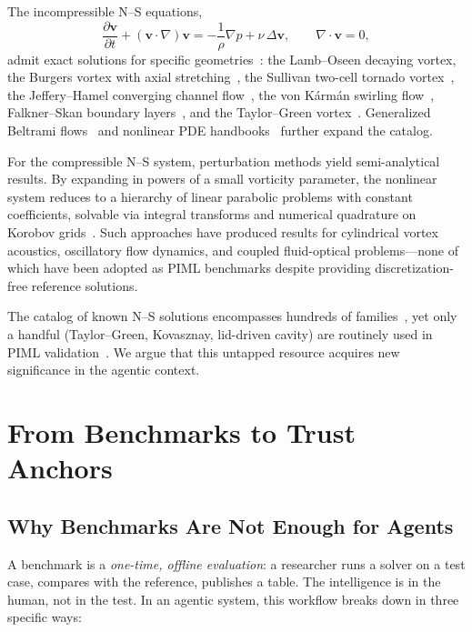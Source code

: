 \documentclass[conference]{IEEEtran}
\begin{document}
The incompressible N--S equations,
\begin{equation}\label{eq:NS}
  \frac{\partial \mathbf{v}}{\partial t} + (\mathbf{v}\cdot\nabla)\mathbf{v}
    = -\frac{1}{\rho}\nabla p + \nu\,\Delta\mathbf{v},
  \qquad \nabla\cdot\mathbf{v}=0,
\end{equation}
admit exact solutions for specific geometries~\cite{Drazin2006,Wang1991}: the Lamb--Oseen decaying vortex, the Burgers vortex with axial stretching~\cite{Burgers1948}, the Sullivan two-cell tornado vortex~\cite{Sullivan1959}, the Jeffery--Hamel converging channel flow~\cite{Jeffery1915}, the von K\'arm\'an swirling flow~\cite{Karman1921}, Falkner--Skan boundary layers~\cite{Schlichting2017}, and the Taylor--Green vortex~\cite{Brachet1983}. Generalized Beltrami flows~\cite{Burmasheva2023} and nonlinear PDE handbooks~\cite{Polyanin2004} further expand the catalog.

For the compressible N--S system, perturbation methods yield semi-analytical results. By expanding in powers of a small vorticity parameter, the nonlinear system reduces to a hierarchy of linear parabolic problems with constant coefficients, solvable via integral transforms and numerical quadrature on Korobov grids~\cite{PetrovaShugaev2015}. Such approaches have produced results for cylindrical vortex acoustics, oscillatory flow dynamics, and coupled fluid-optical problems---none of which have been adopted as PIML benchmarks despite providing discretization-free reference solutions.

The catalog of known N--S solutions encompasses hundreds of families~\cite{Drazin2006}, yet only a handful (Taylor--Green, Kovasznay, lid-driven cavity) are routinely used in PIML validation~\cite{Hao2024}. We argue that this untapped resource acquires new significance in the agentic context.


\section{From Benchmarks to Trust Anchors}
\label{sec:trust}

\subsection{Why Benchmarks Are Not Enough for Agents}

A benchmark is a \emph{one-time, offline evaluation}: a researcher runs a solver on a test case, compares with the reference, publishes a table. The intelligence is in the human, not in the test. In an agentic system, this workflow breaks down in three specific ways:
\end{document}
